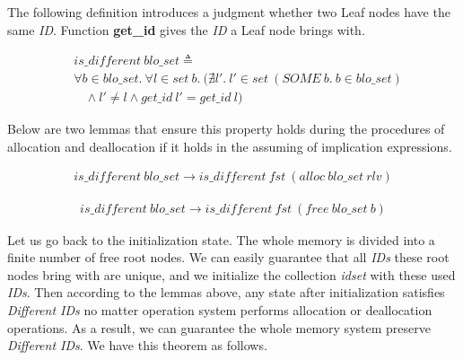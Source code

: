 The following definition introduces a judgment whether two Leaf nodes have the same \emph{ID}. Function \textbf{get\_id} gives the \emph{ID} a Leaf node brings with.

\begin{definition} 
\vspace{-7pt}
\end{definition}
{\footnotesize
\begin{align*}
&is\_different\ blo\_set \triangleq \\
&\forall b \in blo\_set.\ \forall l \in set\ b.\ (\nexists l'.\ l' \in set\ (SOME\ b.\ b \in blo\_set) \\
&\ \ \ \ \wedge l' \ne l \wedge get\_id\ l' = get\_id\ l)
\end{align*}
}
\vspace{-12pt}

Below are two lemmas that ensure this property holds during the procedures of allocation and deallocation if it holds in the assuming of implication expressions.

\begin{lemma} 
\vspace{-7pt}
\end{lemma}
{\footnotesize
\begin{align*}
is\_different\ blo\_set \longrightarrow is\_different\ fst\ (alloc\ blo\_set\ rlv)
\end{align*}
}
\vspace{-12pt}

\begin{lemma} 
\vspace{-7pt}
\end{lemma}
{\footnotesize
\begin{align*}
is\_different\ blo\_set \longrightarrow is\_different\ fst\ (free\ blo\_set\ b)
\end{align*}
}
\vspace{-12pt}

Let us go back to the initialization state. The whole memory is divided into a finite number of free root nodes. We can easily guarantee that all \emph{IDs} these root nodes bring with are unique, and we initialize the collection \emph{idset} with these used \emph{IDs}. Then according to the lemmas above, any state after initialization satisfies \emph{Different IDs} no matter operation system performs allocation or deallocation operations. As a result, we can guarantee the whole memory system preserve \emph{Different IDs}. We have this theorem as follows.

